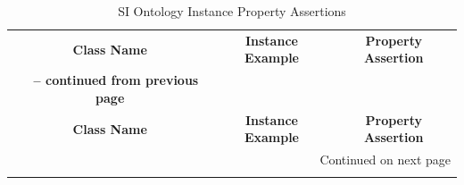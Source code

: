 \begin{center}
\begin{longtable}{|c||c||c|}
\caption[SI Ontology Instance Property Assertions]{SI Ontology Instance Property Assertions} \label{tab:app-ipa} \\

\hline \multicolumn{1}{|c||}{\textbf{Class Name}} & \multicolumn{1}{c||}{\textbf{Instance Example}} & \multicolumn{1}{c|}{\textbf{Property Assertion}} \\ \hhline{|=#=#=|}
\endfirsthead

\multicolumn{3}{c}%
{{\bfseries \tablename\ \thetable{} -- continued from previous page}} \\
\hline \multicolumn{1}{|c||}{\textbf{Class Name}} &
\multicolumn{1}{c||}{\textbf{Instance Example}} &
\multicolumn{1}{c|}{\textbf{Property Assertion}} \\ \hline 
\endhead

\hline \multicolumn{3}{|r|}{{Continued on next page}} \\ \hline
\endfoot


\end{longtable}
\end{center}
